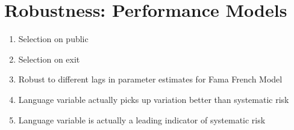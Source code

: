 \chapter{Robustness: Performance Models\label{apndxB}}

\begin{enumerate}
  \item Selection on public
  \item Selection on exit
  \item Robust to different lags in parameter estimates for Fama French Model
  \item Language variable actually picks up variation better than systematic risk
  \item Language variable is actually a leading indicator of systematic risk
\end{enumerate}

